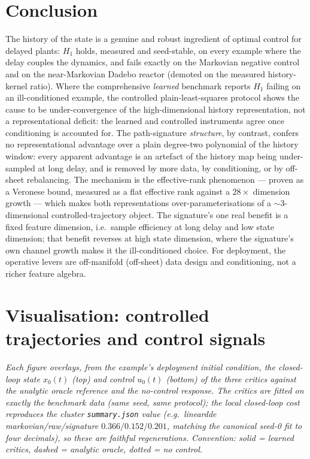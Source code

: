 \documentclass[11pt]{article}
\renewcommand{\_}{\discretionary{\textunderscore}{}{\textunderscore}}
\theoremstyle{plain}
\theoremstyle{definition}
\begin{document}
\section{Conclusion}\label{sec:conclusion}

The history of the state is a genuine and robust ingredient of optimal control for delayed
plants: $H_1$ holds, measured and seed-stable, on every example where the delay couples the
dynamics, and fails exactly on the Markovian negative control and on the near-Markovian Dadebo
reactor (demoted on the measured history-kernel ratio). Where the comprehensive \emph{learned}
benchmark reports $H_1$ failing on an ill-conditioned example, the controlled plain-least-squares
protocol shows the cause to be under-convergence of the high-dimensional history representation,
not a representational deficit: the learned and controlled instruments agree once conditioning is
accounted for. The path-signature
\emph{structure}, by contrast, confers no representational advantage over a plain degree-two
polynomial of the history window: every apparent advantage is an artefact of the history map being
under-sampled at long delay, and is removed by more data, by conditioning, or by off-sheet
rebalancing. The mechanism is the effective-rank phenomenon --- proven as a Veronese bound,
measured as a flat effective rank against a $28\times$ dimension growth --- which makes both
representations over-parameterisations of a ${\sim}3$-dimensional controlled-trajectory object.
The signature's one real benefit is a fixed feature dimension, i.e.\ sample efficiency at long
delay and low state dimension; that benefit reverses at high state dimension, where the
signature's own channel growth makes it the ill-conditioned choice. For deployment, the
operative levers are off-manifold (off-sheet) data design and conditioning, not a richer feature
algebra.

\appendix

\section{Visualisation: controlled trajectories and control signals}\label{app:viz}

\emph{Each figure overlays, from the example's deployment initial condition, the closed-loop state
$x_0(t)$ (top) and control $u_0(t)$ (bottom) of the three critics against the analytic oracle
reference and the no-control response. The critics are fitted on exactly the benchmark data
(same seed, same protocol); the local closed-loop cost reproduces the cluster
\texttt{summary.json} value (e.g.\ linear\_dde markovian/raw/signature $0.366/0.152/0.201$,
matching the canonical seed-0 fit to four decimals), so these are faithful regenerations.
Convention: \emph{solid} = learned critics, \emph{dashed} = analytic oracle, \emph{dotted} =
no control.}
\end{document}
